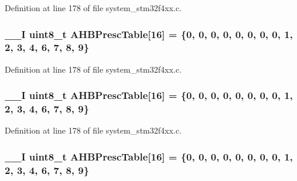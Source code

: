 Definition at line 178 of file system\-\_\-stm32f4xx.\-c.

\hypertarget{group___s_t_m32_f4xx___system___private___variables_gacdc3ef54c0704c90e69a8a84fb2d970d}{
\subsubsection[{A\-H\-B\-Presc\-Table}]{\setlength{\rightskip}{0pt plus 5cm}\-\_\-\-\_\-\-I {\bf uint8\-\_\-t} A\-H\-B\-Presc\-Table\mbox{[}16\mbox{]} = \{0, 0, 0, 0, 0, 0, 0, 0, 1, 2, 3, 4, 6, 7, 8, 9\}}}\label{group___s_t_m32_f4xx___system___private___variables_gacdc3ef54c0704c90e69a8a84fb2d970d}


Definition at line 178 of file system\-\_\-stm32f4xx.\-c.

\hypertarget{group___s_t_m32_f4xx___system___private___variables_gacdc3ef54c0704c90e69a8a84fb2d970d}{
\subsubsection[{A\-H\-B\-Presc\-Table}]{\setlength{\rightskip}{0pt plus 5cm}\-\_\-\-\_\-\-I {\bf uint8\-\_\-t} A\-H\-B\-Presc\-Table\mbox{[}16\mbox{]} = \{0, 0, 0, 0, 0, 0, 0, 0, 1, 2, 3, 4, 6, 7, 8, 9\}}}\label{group___s_t_m32_f4xx___system___private___variables_gacdc3ef54c0704c90e69a8a84fb2d970d}


Definition at line 178 of file system\-\_\-stm32f4xx.\-c.

\hypertarget{group___s_t_m32_f4xx___system___private___variables_gacdc3ef54c0704c90e69a8a84fb2d970d}{
\subsubsection[{A\-H\-B\-Presc\-Table}]{\setlength{\rightskip}{0pt plus 5cm}\-\_\-\-\_\-\-I {\bf uint8\-\_\-t} A\-H\-B\-Presc\-Table\mbox{[}16\mbox{]} = \{0, 0, 0, 0, 0, 0, 0, 0, 1, 2, 3, 4, 6, 7, 8, 9\}}}\label{group___s_t_m32_f4xx___system___private___variables_gacdc3ef54c0704c90e69a8a84fb2d970d}


